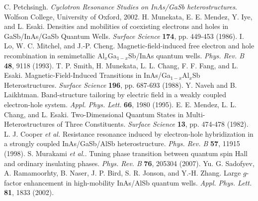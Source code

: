 \documentclass[titlepage,a4paper]{book}
\begin{document}
\begin{thebibliography}{199}
C. Petchsingh. \textit{Cyclotron Resonance Studies on InAs/GaSb heterostructures}. Wolfson College, University of Oxford, 2002.
H. Munekata, E. E. Mendez, Y. Iye, and L. Esaki. Densities and mobilities of coexisting electrons and holes in GaSb/InAs/GaSb Quantum Wells. \textit{Surface Science} \textbf{174}, pp. 449-453 (1986).
I. Lo, W. C. Mitchel, and J.-P. Cheng. Magnetic-field-induced free electron and hole recombination in semimetallic Al$_x$Ga$_{1-x}$Sb/InAs quantum wells. \textit{Phys. Rev. B} \textbf{48}, 9118 (1993).
T. P. Smith, H. Munekata, L. L. Chang, F. F. Fang, and L. Esaki. Magnetic-Field-Induced Transitions in InAs/Ga$_{1-x}$Al$_x$Sb Heterostructures. \textit{Surface Science} \textbf{196}, pp. 687-693 (1988).
Y. Naveh and B. Laikhtman. Band-structure tailoring by electric field in a weakly coupled electron-hole system. \textit{Appl. Phys. Lett.} \textbf{66}, 1980 (1995).
E. E. Mendez, L. L. Chang, and L. Esaki. Two-Dimensional Quantum States in Multi-Heterostructures of Three Constituents. \textit{Surface Science} \textbf{13}, pp. 474-478 (1982).
L. J. Cooper \textit{et al.} Resistance resonance induced by electron-hole hybridization in a strongly coupled InAs/GaSb/AlSb heterostructure. \textit{Phys. Rev. B} \textbf{57}, 11915 (1998).
S. Murakami \textit{et al.}. Tuning phase transition between quantum spin Hall and ordinary insulating phases. \textit{Phys. Rev. B} \textbf{76}, 205304 (2007).
Yu. G. Sadofyev, A. Ramamoorhty, B. Naser, J. P. Bird, S. R. Jonson, and Y.-H. Zhang. Large $g$-factor enhancement in high-mobility InAs/AlSb quantum wells. \textit{Appl. Phys. Lett.} \textbf{81}, 1833 (2002).
\end{thebibliography}

\listoffigures
\end{document}
